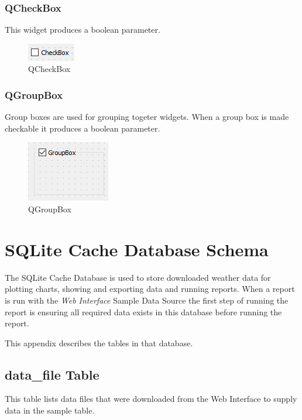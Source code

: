 \documentclass[a4paper,10pt]{book}
\begin{document}
\subsection{QCheckBox}

This widget produces a boolean parameter.

\begin {figure}[!ht]
 \centering
 \includegraphics[scale=1.0]{images/widget/qcheckbox}
 \caption{QCheckBox}
\end {figure}

\subsection{QGroupBox}

Group boxes are used for grouping togeter widgets. When a group box is made checkable it produces a boolean parameter.

\begin {figure}[!ht]
 \centering
 \includegraphics[scale=1.0]{images/widget/qgroupbox}
 \caption{QGroupBox}
\end {figure}



\appendix

\chapter{SQLite Cache Database Schema}
The SQLite Cache Database is used to store downloaded weather data for plotting charts, showing and exporting data and running reports. When a report is run with the \emph{Web Interface} Sample Data Source the first step of running the report is ensuring all required data exists in this database before running the report.

This appendix describes the tables in that database.

\section{data\_file Table}
This table lists data files that were downloaded from the Web Interface to supply data in the sample table.
\end{document}
